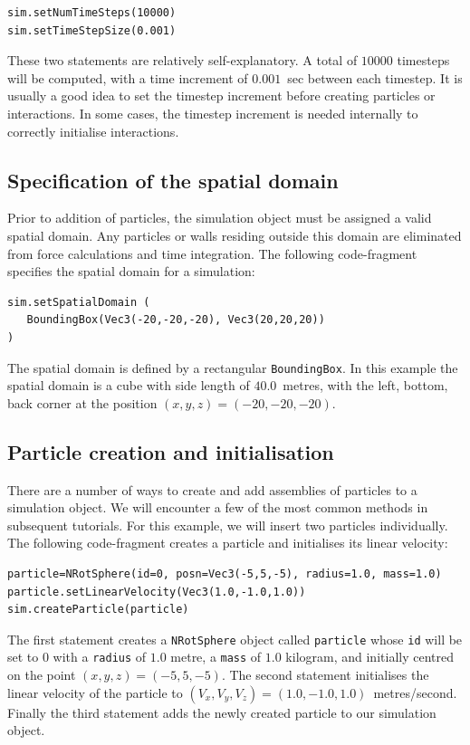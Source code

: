 \begin{verbatim}
sim.setNumTimeSteps(10000)
sim.setTimeStepSize(0.001)
\end{verbatim}

These two statements are relatively self-explanatory. A total of $10000$ timesteps will be computed, with a time increment of $0.001$~sec between each timestep. It is usually a good idea to set the timestep increment before creating particles or interactions. In some cases, the timestep increment is needed internally to correctly initialise interactions. 

\subsection{Specification of the spatial domain}

Prior to addition of particles, the simulation object must be assigned a valid spatial domain. Any particles or walls residing outside this domain are eliminated from force calculations and time integration.  The following code-fragment specifies the spatial domain for a simulation:

\begin{verbatim}
sim.setSpatialDomain (
   BoundingBox(Vec3(-20,-20,-20), Vec3(20,20,20))
)
\end{verbatim}

\noindent
The spatial domain is defined by a rectangular \texttt{BoundingBox}. In this example the spatial domain is a cube with side length of $40.0$~metres, with the left, bottom, back corner at the position $(x,y,z) = (-20, -20, -20)$. 

\subsection{Particle creation and initialisation}

There are a number of ways to create and add assemblies of particles to a simulation object. We will encounter a few of the most common methods in subsequent tutorials. For this example, we will insert two particles individually. The following code-fragment creates a particle and initialises its linear velocity:

\begin{verbatim}
particle=NRotSphere(id=0, posn=Vec3(-5,5,-5), radius=1.0, mass=1.0)
particle.setLinearVelocity(Vec3(1.0,-1.0,1.0))
sim.createParticle(particle)
\end{verbatim}

The first statement creates a \texttt{NRotSphere} object called \texttt{particle} whose \texttt{id} will be set to $0$ with a \texttt{radius} of $1.0$ metre, a \texttt{mass} of $1.0$ kilogram, and initially centred on the point $(x,y,z) = (-5,5,-5)$. The second statement initialises the linear velocity of the particle to $(V_x,V_y,V_z) = (1.0,-1.0,1.0)$~metres/second. Finally the third statement adds the newly created particle to our simulation object.

